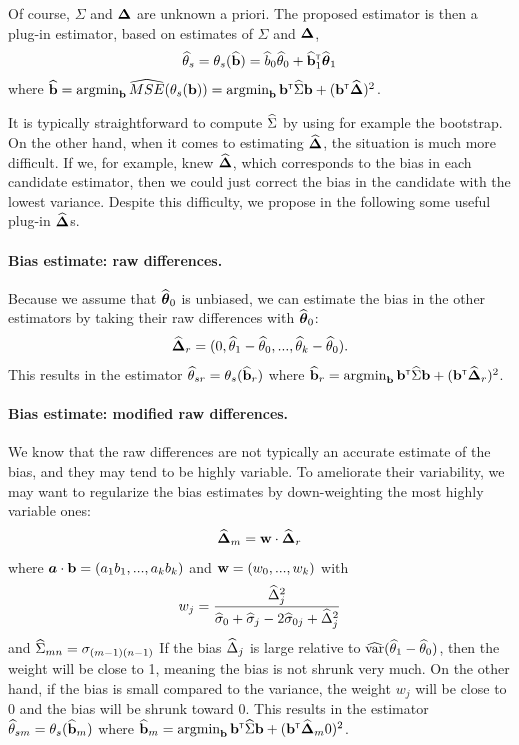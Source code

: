 \documentclass{article}
\begin{document}
Of course, $\Sigma$ and $\boldsymbol{\Delta}$ are unknown a priori. The proposed estimator is then a plug-in estimator, based on estimates of $\Sigma$ and $\boldsymbol{\Delta}$,
\begin{align}
    {\widehat\theta}_s = \theta_s({\widehat {{\bf b}}}) = {\widehat b}_0{\widehat\theta}_0 + {\widehat {{\bf b}}}_1^{{\sf \scriptscriptstyle{T}}}{\widehat{\boldsymbol{\theta}}}_1
\end{align}
where $ {\widehat {{\bf b}}} = \mathop{\mbox{argmin}}_{{\bf b}}\widehat{MSE}(\theta_s({\bf b})) = \mathop{\mbox{argmin}}_{{\bf b}}{\bf b}^{{\sf \scriptscriptstyle{T}}}{\widehat\Sigma}{\bf b} + ({\bf b}^{{\sf \scriptscriptstyle{T}}} {\widehat{\boldsymbol{\Delta}}})^2$. 

It is typically straightforward to compute ${\widehat\Sigma}$ by using for example the bootstrap. On the other hand, when it comes to estimating ${\widehat{\boldsymbol{\Delta}}}$, the situation is much more difficult. If we, for example, knew ${\widehat{\boldsymbol{\Delta}}}$, which corresponds to the bias in each candidate estimator, then we could just correct the bias in the candidate with the lowest variance. Despite this difficulty, we propose in the following some useful plug-in ${\widehat{\boldsymbol{\Delta}}}$s.

\paragraph{Bias estimate: raw differences.}
Because we assume that ${\widehat{\boldsymbol{\theta}}}_0$ is unbiased, we can estimate the bias in the other estimators by taking their raw differences with ${\widehat{\boldsymbol{\theta}}}_0$:
\[
{\widehat{\boldsymbol{\Delta}}}_r = (0, {\widehat\theta}_1 - {\widehat\theta}_0, ..., {\widehat\theta}_k - {\widehat\theta}_0).
\]
This results in the estimator ${\widehat\theta}_{sr} = \theta_s({\widehat {{\bf b}}}_r)$ where ${\widehat {{\bf b}}}_r = \mathop{\mbox{argmin}}_{{\bf b}}{\bf b}^{{\sf \scriptscriptstyle{T}}}{\widehat\Sigma}{\bf b} + ({\bf b}^{{\sf \scriptscriptstyle{T}}} {\widehat{\boldsymbol{\Delta}}}_r)^2$.

\paragraph{Bias estimate: modified raw differences.}
We know that the raw differences are not typically an accurate estimate of the bias, and they may tend to be highly variable. To ameliorate their variability, we may want to regularize the bias estimates by down-weighting the most highly variable ones: 
\[
{\widehat{\boldsymbol{\Delta}}}_m = {\bf w} \cdot {\widehat{\boldsymbol{\Delta}}}_r
\]
where ${\mbox{\boldmath$a$}} \cdot {\bf b} = (a_1b_1, ..., a_kb_k)$ and ${\bf w} = (w_0, ..., w_k)$ with
\[
w_j = \frac{{\widehat\Delta}_j^2}{{\widehat\sigma}_0 + {\widehat\sigma}_j - 2{\widehat\sigma}_{0j} + {\widehat\Delta}_j^2}
\]
and ${\widehat\Sigma}_{mn} = \sigma_{(m-1)(n-1)}$
If the bias ${\widehat\Delta}_j$ is large relative to $\widehat{\mbox{var}}({\widehat\theta}_1 - {\widehat\theta}_0)$, then the weight will be close to 1, meaning the bias is not shrunk very much. On the other hand, if the bias is small compared to the variance, the weight $w_j$ will be close to 0 and the bias will be shrunk toward 0. This results in the estimator ${\widehat\theta}_{sm} = \theta_s({\widehat {{\bf b}}}_m)$ where ${\widehat {{\bf b}}}_m = \mathop{\mbox{argmin}}_{{\bf b}}{\bf b}^{{\sf \scriptscriptstyle{T}}}{\widehat\Sigma}{\bf b} + ({\bf b}^{{\sf \scriptscriptstyle{T}}} {\widehat{\boldsymbol{\Delta}}}_m0)^2$.
\end{document}

